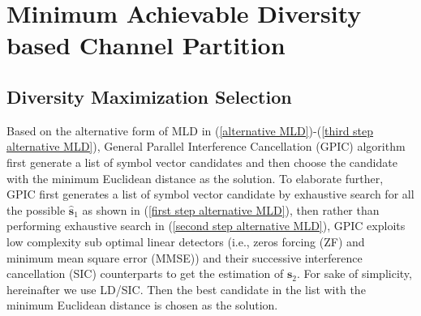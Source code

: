 \documentclass[12pt, draftclsnofoot, onecolumn]{IEEEtran}
\begin{document}
%



\section{Minimum Achievable Diversity based Channel Partition}
\subsection{Diversity Maximization Selection}
Based on the alternative form of MLD in (\ref{alternative MLD})-(\ref{third step alternative MLD}), General Parallel Interference Cancellation (GPIC) algorithm first generate a list of symbol vector candidates and then choose the candidate with the minimum Euclidean distance as the solution. To elaborate further, GPIC first generates a list of symbol vector candidate by exhaustive search for all the possible $\hat{\mathbf{s}}_{1}$ as shown in (\ref{first step alternative MLD}), then rather than performing exhaustive search in (\ref{second step alternative MLD}), GPIC exploits low complexity sub optimal linear detectors (i.e., zeros forcing (ZF) and minimum mean square error (MMSE)) and their successive interference cancellation (SIC) counterparts to get the estimation of $\mathbf{s}_{2}$. For sake of simplicity, hereinafter we use LD/SIC. Then the best candidate in the list with the minimum Euclidean distance is chosen as the solution. 
\end{document}
